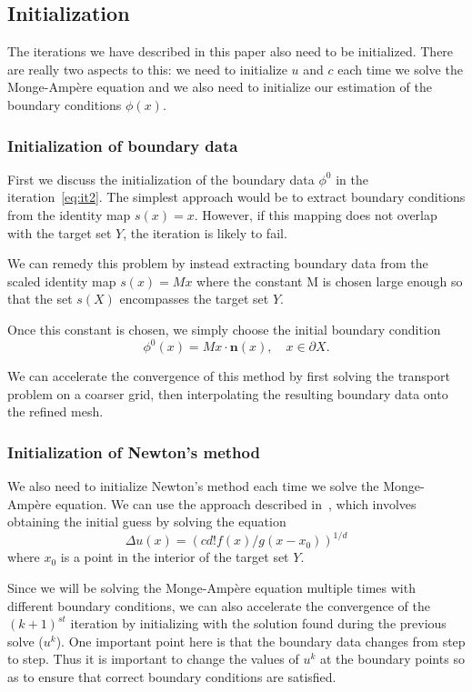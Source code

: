 \documentclass{amsart}
\theoremstyle{lemma}
\theoremstyle{remark}
\begin{document}
\subsection{Initialization}\label{sec:init}
The iterations we have described in this paper also need to be initialized.  There are really two aspects to this: we need to initialize $u$ and $c$ each time we solve the {{Monge-Amp\`ere}\xspace} equation and we also need to initialize our estimation of the boundary conditions $\phi(x)$.

\subsubsection{Initialization of boundary data}
First we discuss the initialization of the boundary data $\phi^0$ in the iteration~\eqref{eq:it2}.  The simplest approach would be to extract boundary conditions from the identity map $s(x) = x$.  However, if this mapping does not overlap with the target set $Y$, the iteration is likely to fail.  

We can remedy this problem by instead extracting boundary data from the scaled identity map $s(x) = Mx$ where the constant M is chosen large enough so that the set $s(X)$ encompasses the target set $Y$.

Once this constant is chosen, we simply choose the initial boundary condition
\[ \phi^0(x) = Mx\cdot{\mathbf{n}}(x),\quad x\in\partial X. \]

We can accelerate the convergence of this method by first solving the transport problem on a coarser grid, then interpolating the resulting boundary data onto the refined mesh.

\subsubsection{Initialization of Newton's method}
We also need to initialize Newton's method each time we solve the {{Monge-Amp\`ere}\xspace} equation.
We can use the approach described in~\cite{FOTheory}, which involves obtaining the initial guess by solving the equation
\[
\Delta u(x) = (c{d!f(x)/g(x-x_0)})^{1/d}
\]
where $x_0$ is a point in the interior of the target set $Y$.

Since we will be solving the {{Monge-Amp\`ere}\xspace} equation multiple times with different boundary conditions, we can also accelerate the convergence of the $(k+1)^{st}$ iteration by initializing with the solution found during the previous solve ($u^k$).  One important point here is that the boundary data changes from step to step.  Thus it is important to change the values of $u^k$ at the boundary points so as to ensure that correct boundary conditions are satisfied.
\end{document}
